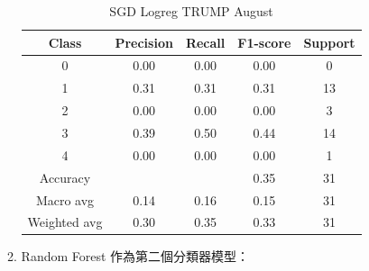 \begin{enumerate}
\begin{enumerate}
\begin{table}[H]
                \vspace{1em} %
                
                \scriptsize
                \begin{tabular}{c|cccc}
                \hline
                Class & Precision & Recall & F1-score & Support \\
                \hline
                0 & 0.00 & 0.00 & 0.00 & 0 \\
                1 & 0.31 & 0.31 & 0.31 & 13 \\
                2 & 0.00 & 0.00 & 0.00 & 3 \\
                3 & 0.39 & 0.50 & 0.44 & 14 \\
                4 & 0.00 & 0.00 & 0.00 & 1 \\
                \hline
                Accuracy &       &      & 0.35 & 31 \\
                Macro avg & 0.14 & 0.16 & 0.15 & 31 \\
                Weighted avg & 0.30 & 0.35 & 0.33 & 31 \\
                \hline
                \end{tabular}
                \caption{SGD Logreg TRUMP August}
                \label{tab:classifier_2_report_sgd_logreg_trump_filtered_aug}
                \end{table}



                \pagebreak
    
                \item Random Forest 作為第二個分類器模型：


\end{enumerate}
\end{enumerate}
